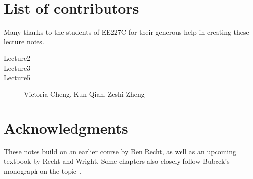 \section{List of contributors}

Many thanks to the students of EE227C for their generous help in creating these
lecture notes.

\begin{description}
\item[Lecture2]
\item[Lecture3]
\item[Lecture5] Victoria Cheng, Kun Qian, Zeshi Zheng
\end{description}

\section{Acknowledgments}

These notes build on an earlier course by Ben Recht, as well as an upcoming
textbook by Recht and Wright. Some chapters also closely follow Bubeck's
monograph on the topic~\cite{Bubeck}.
